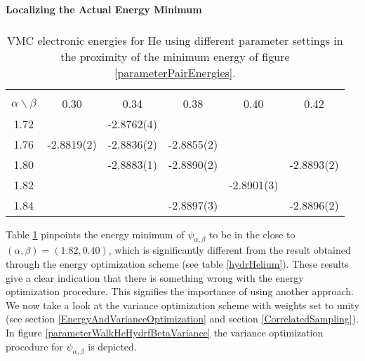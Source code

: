 \begin{table}[hbtp]
\begin{center} {\large \bf Localizing the Actual Energy Minimum} \\ 
$\phantom{a}$ \\
\begin{tabular}{cccccc}
\hline\\ 
$\alpha \backslash \beta$ & 0.30       & 0.34       & 0.38       & 0.40       & 0.42       \\
1.72                      &            & -2.8762(4) &            &            &            \\
1.76                      & -2.8819(2) & -2.8836(2) & -2.8855(2) &            &            \\
1.80                      &            & -2.8883(1) & -2.8890(2) &            & -2.8893(2) \\
1.82                      &            &            &            & -2.8901(3) &            \\
1.84                      &            &            & -2.8897(3) &            & -2.8896(2) \\ [10pt]    
\hline
\end{tabular} 
\end{center}
\caption{VMC electronic energies for He using different parameter
  settings in the proximity of the minimum energy of figure
  \ref{parameterPairEnergies}.} 
  \label{energyMinimaCheck}
\end{table}

Table \ref{energyMinimaCheck} pinpoints the energy minimum of
$\psi_{\alpha,\beta}$ to be in the
close to $(\alpha,\beta) = (1.82,0.40)$, which is significantly 
different from the result obtained through the energy optimization
scheme (see table \ref{hydrHelium}). These results give a clear
indication that there is something wrong with the energy optimization
procedure. This signifies the importance of using another approach. 
\newline
%
\newline
We now take a look at the variance optimization scheme with weights
set to unity (see section \ref{EnergyAndVarianceOptimization} and
section \ref{CorrelatedSampling}). In figure
\ref{parameterWalkHeHydrfBetaVariance} the variance optimization
procedure for $\psi_{\alpha,\beta}$ is depicted.
\newline

